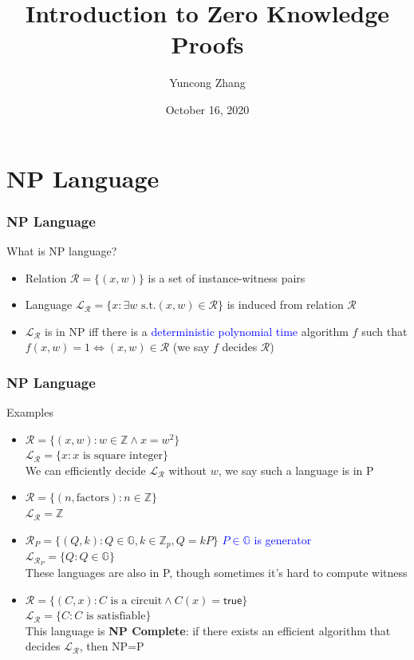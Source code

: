 \documentclass{beamer}
\title{Introduction to Zero Knowledge Proofs}
\author{Yuncong Zhang}
\date{October 16, 2020}
\newcommand{\blue}[1]{\textcolor{blue}{#1}}
\newcommand{\dgreen}[1]{\textcolor{dgreen}{#1}}
\begin{document}
\frame{\titlepage}

\section[Outline]{}

\section{NP Language}
\frame
{
  \frametitle{NP Language}
  \onslide<+-> What is NP language?
  \begin{itemize}
    \item<+-> Relation $\mathcal{R}=\{(x,w)\}$ is a set of instance-witness pairs
    \item<+-> Language $\mathcal{L}_\mathcal{R}=\{x:\exists w \text{ s.t.} (x,w)\in\mathcal{R}\}$ is induced from relation $\mathcal{R}$
    \item<+-> $\mathcal{L}_{\mathcal{R}}$ is in NP iff there is a \blue{deterministic polynomial time} algorithm $f$ such that $f(x,w)=1\Leftrightarrow (x,w)\in\mathcal{R}$ (we say $f$ decides $\mathcal{R}$)
  \end{itemize}
}
{
  \frametitle{NP Language}
  \onslide<+-> Examples
  \begin{itemize}
    \item<+-> $\mathcal{R}=\{(x,w):w\in\mathbb{Z}\wedge x=w^2\}$\\
    $\mathcal{L}_{\mathcal{R}}=\{x:x\text{ is square integer}\}$\\
    \onslide<+-> \dgreen{We can efficiently decide $\mathcal{L}_{\mathcal{R}}$ without $w$, we say such a language is in P}
    \item<+-> $\mathcal{R}=\{(n,\text{factors}):n\in\mathbb{Z}\}$\\
    $\mathcal{L}_{\mathcal{R}}=\mathbb{Z}$
    \item<+-> $\mathcal{R}_P=\{(Q,k):Q\in\mathbb{G},k\in\mathbb{Z}_p, Q=kP\}$ \blue{$P\in\mathbb{G}$ is generator}\\
    $\mathcal{L}_{\mathcal{R}_P}=\{Q:Q\in\mathbb{G}\}$\\
    \onslide<+-> \dgreen{These languages are also in P, though sometimes it's hard to compute witness}
    \item<+-> $\mathcal{R}=\{(C,x):C\text{ is a circuit}\wedge C(x)=\mathsf{true}\}$\\
    $\mathcal{L}_{\mathcal{R}}=\{C:C\text{ is satisfiable}\}$\\
    \onslide<+-> \dgreen{This language is \textbf{NP Complete}: if there exists an efficient algorithm that decides $\mathcal{L}_{\mathcal{R}}$, then NP=P}
  \end{itemize}
}
\end{document}
